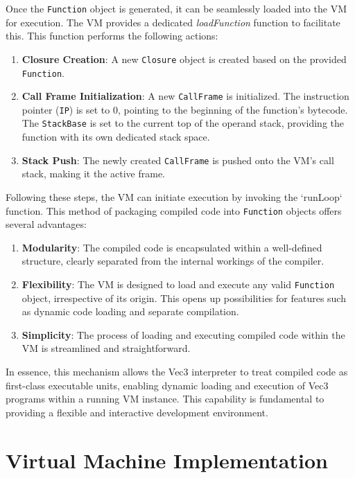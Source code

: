 Once the \texttt{Function} object is generated, it can be seamlessly loaded into the VM for execution.
The VM provides a dedicated \textit{loadFunction} function to facilitate this.
This function performs the following actions:
\begin{enumerate}
    \item \textbf{Closure Creation}: A new \texttt{Closure} object is created based on the provided \texttt{Function}.
    \item \textbf{Call Frame Initialization}: A new \texttt{CallFrame} is initialized.
    The instruction pointer (\texttt{IP}) is set to 0, pointing to the beginning of the function's bytecode.
    The \texttt{StackBase} is set to the current top of the operand stack, providing the function with its own dedicated stack space.
    \item \textbf{Stack Push}: The newly created \texttt{CallFrame} is pushed onto the VM's call stack, making it the active frame.
\end{enumerate}
Following these steps, the VM can initiate execution by invoking the `runLoop` function.
This method of packaging compiled code into \texttt{Function} objects offers several advantages:

\begin{enumerate}
    \item \textbf{Modularity}: The compiled code is encapsulated within a well-defined structure, clearly separated from the internal workings of the compiler.
    \item \textbf{Flexibility}: The VM is designed to load and execute any valid \texttt{Function} object, irrespective of its origin.
    This opens up possibilities for features such as dynamic code loading and separate compilation.
    \item \textbf{Simplicity}: The process of loading and executing compiled code within the VM is streamlined and straightforward.
\end{enumerate}
In essence, this mechanism allows the Vec3 interpreter to treat compiled code as first-class executable units, enabling dynamic loading and execution of Vec3 programs within a running VM instance.
This capability is fundamental to providing a flexible and interactive development environment.

\section{Virtual Machine Implementation}
\label{sec:virtual-machine}

